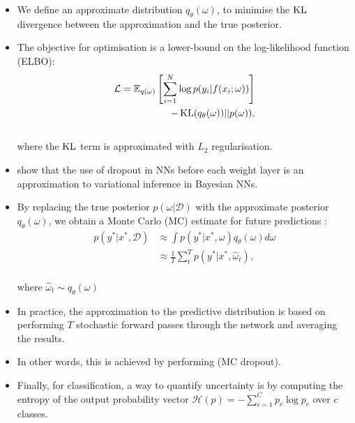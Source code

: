 \documentclass{beamer}
\begin{document}
{\begin{itemize}
\item We define an approximate distribution $q_\theta(\omega)$, to minimise the $\operatorname{KL}$ divergence between the approximation and the true posterior. 

\item The objective for optimisation is  a lower-bound  on  the  log-likelihood function (ELBO): \\
\begin{equation}
\begin{aligned}
    \mathcal L =  \mathbb E_{q(\omega)} \left[\sum_{i=1}^{N} \log p(y_i | f(x_i; \omega))\right]\\ -\operatorname{KL}(q_{\theta}(\omega))||p(\omega)), 
\end{aligned}
\label{objective}
\end{equation} \\
where the $\operatorname{KL}$ term is approximated with $L_2$ regularisation.
\item  \citet{doprout_gal16} show that the use of dropout  in NNs before each weight layer is an approximation to variational inference in Bayesian NNs.


\item By replacing the true posterior $p(\omega| \mathcal{D})$ with the approximate posterior $q_\theta(\omega)$, we obtain a Monte Carlo (MC) estimate for future predictions : \\
\begin{equation}
\begin{aligned}
    p(y^*|x^*, \mathcal{D}) &\approx  \int p(y^*|x^*, \omega)q_\theta(\omega) d \omega \\
    &\approx \frac{1}{T}\sum_{t}^{T}p(y^{*}|x^{*}, \hat{\omega}_t),
\end{aligned}
\end{equation} \\
where $\hat{\omega}_t \sim q_\theta(\omega)$%
\item In practice, the approximation to the predictive distribution is based on performing $T$ stochastic forward passes through the network and averaging the results.
\item  In other words, this is achieved by performing  (MC dropout).
\item Finally, for classification, a way to quantify uncertainty is by computing the entropy of the output probability vector $\mathcal H(p) = - \sum_{c=1}^{C} p_c \log p_c$ over $c$ classes.




\end{itemize}

}
\end{document}
